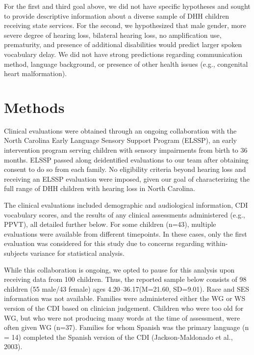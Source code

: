 \documentclass[english,man,floatsintext]{apa6}
\begin{document}
For the first and third goal above, we did not have specific hypotheses and sought to provide descriptive information about a diverse sample of DHH children receiving state services. For the second, we hypothesized that male gender, more severe degree of hearing loss, bilateral hearing loss, no amplification use, prematurity, and presence of additional disabilities would predict larger spoken vocabulary delay. We did not have strong predictions regarding communication method, language background, or presence of other health issues (e.g., congenital heart malformation).

\hypertarget{methods}{%
\section{Methods}\label{methods}}

Clinical evaluations were obtained through an ongoing collaboration with the North Carolina Early Language Sensory Support Program (ELSSP), an early intervention program serving children with sensory impairments from birth to 36 months. ELSSP passed along deidentified evaluations to our team after obtaining consent to do so from each family. No eligibility criteria beyond hearing loss and receiving an ELSSP evaluation were imposed, given our goal of characterizing the full range of DHH children with hearing loss in North Carolina.

The clinical evaluations included demographic and audiological information, CDI vocabulary scores, and the results of any clinical assessments administered (e.g., PPVT), all detailed further below. For some children (n=43), multiple evaluations were available from different timepoints. In these cases, only the first evaluation was considered for this study due to concerns regarding within-subjects variance for statistical analysis.

While this collaboration is ongoing, we opted to pause for this analysis upon receiving data from 100 children. Thus, the reported sample below consists of 98 children (55 male/43 female) ages 4.20--36.17(M=21.60, SD=9.01). Race and SES information was not available. Families were administered either the WG or WS version of the CDI based on clinician judgement. Children who were too old for WG, but who were not producing many words at the time of assessment, were often given WG (n=37). Families for whom Spanish was the primary language (n = 14) completed the Spanish version of the CDI (Jackson-Maldonado et al., 2003).

\begin{table}

\caption{\label{tab:CDIinfo}CDI details}
\centering
{}
\end{table}
\end{document}

